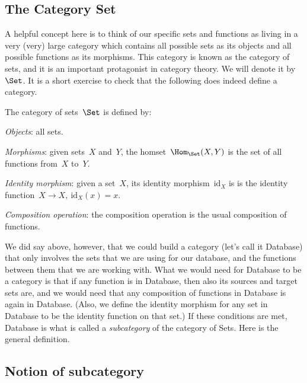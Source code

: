 \subsection{The Category Set}

A helpful concept here is to think of our specific sets and functions as living in a very (very) large category which contains all possible sets as its objects and all possible functions as its morphisms. This category is known as the category of sets, and it is an important protagonist in category theory. We will denote it by $\Set$. It is a short exercise to check that the following does indeed define a category.

\begin{ctdefinition}
The category of sets~$\Set$ is defined by:
    \begin{compactenum}
    \item \emph{Objects}: all sets.
    \item \emph{Morphisms}: given sets~$X$ and~$Y$, the homset~$\Hom_\Set(X,Y)$ is the set of all functions from~$X$ to~$Y$.
    \item \emph{Identity morphism}: given a set~$X$, its identity morphism~$\text{id}_X$ is
    is the identity function~$X \to X, \ \text{id}_X(x) = x$.
    \item \emph{Composition operation}: the composition operation is the usual composition of functions.
    \end{compactenum}
\end{ctdefinition} 



We did say above, however, that we could build a category (let's call it \textsf{Database}) that only involves the sets that we are using for our database, and the functions between them that we are working with. What we would need for \textsf{Database} to be a category is that if any function is in \textsf{Database}, then also its sources and target sets are, and we would need that any composition of functions in \textsf{Database} is again in \textsf{Database}. (Also, we define the identity morphism for any set in \textsf{Database} to be the identity function on that set.) If these conditions are met, \textsf{Database} is what is called a \emph{subcategory} of the category of Sets. Here is the general definition. 


\subsection{Notion of subcategory}
 
